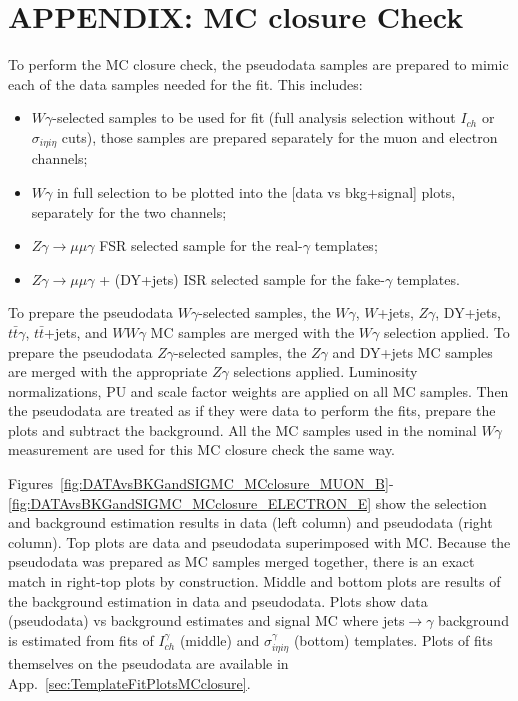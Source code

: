 \section{APPENDIX: MC closure Check}
\label{sec:MCclosureCheck}

To perform the MC closure check, the pseudodata samples are prepared to mimic each of the data samples needed for the fit. This includes:
\begin{itemize}
  \item $W\gamma$-selected samples to be used for fit (full analysis selection without $I_{ch}$ or $\sigma_{i\eta i\eta}$ cuts), those samples are prepared separately for the muon and electron channels;
  \item $W\gamma$ in full selection to be plotted into the [data vs bkg+signal] plots, separately for the two channels;
  \item $Z\gamma\rightarrow\mu\mu\gamma$ FSR selected sample for the real-$\gamma$ templates;
  \item $Z\gamma\rightarrow\mu\mu\gamma$ + (DY+jets) ISR selected sample for the fake-$\gamma$ templates.
\end{itemize}

To prepare the pseudodata $W\gamma$-selected samples, the $W\gamma$, $W$+jets, $Z\gamma$, DY+jets, $t\bar{t}\gamma$, $t\bar{t}$+jets, and $WW\gamma$ MC samples are merged with the $W\gamma$ selection applied. To prepare the pseudodata $Z\gamma$-selected samples, the $Z\gamma$ and DY+jets MC samples are merged with the appropriate $Z\gamma$ selections applied. Luminosity normalizations, PU and scale factor weights are applied on all MC samples. Then the pseudodata are treated as if they were data to perform the fits, prepare the plots and subtract the background. All the MC samples used in the nominal $W\gamma$ measurement are used for this MC closure check the same way.

Figures~\ref{fig:DATAvsBKGandSIGMC_MCclosure_MUON_B}-\ref{fig:DATAvsBKGandSIGMC_MCclosure_ELECTRON_E} show the selection and background estimation results in data (left column) and pseudodata (right column). Top plots are data and pseudodata superimposed with MC. Because the pseudodata was prepared as MC samples merged together, there is an exact match in right-top plots by construction. Middle and bottom plots are results of the background estimation in data and pseudodata. Plots show data (pseudodata) vs background estimates and signal MC where jets$\rightarrow\gamma$ background is estimated from fits of $I_{ch}^{\gamma}$ (middle) and  $\sigma_{i\eta i\eta}^{\gamma}$ (bottom) templates. Plots of fits themselves on the pseudodata are available in App.~\ref{sec:TemplateFitPlotsMCclosure}.

